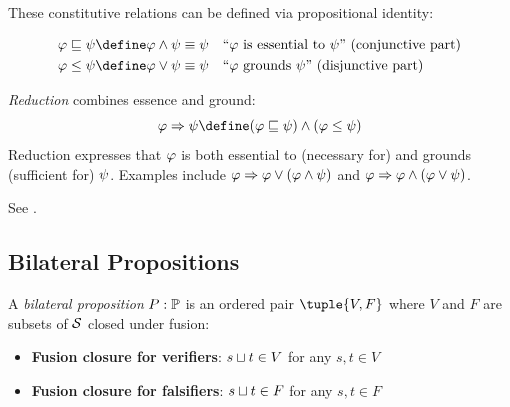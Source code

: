 \documentclass[../LogosReference.tex]{subfiles}
\begin{document}
These constitutive relations can be defined via propositional identity:

\begin{definition}\label{def:essence-ground}
	\begin{align}
		\metaA \essence \metaB & \define \metaA \land \metaB \equiv \metaB &  & \text{``$\metaA$ is essential to $\metaB$'' (conjunctive part)} \\
		\metaA \ground \metaB  & \define \metaA \lor \metaB \equiv \metaB  &  & \text{``$\metaA$ grounds $\metaB$'' (disjunctive part)}
	\end{align}
\end{definition}

\begin{definition}[Reduction]\label{def:reduction}
  \emph{Reduction} combines essence and ground:
  \[
    \metaA \Rightarrow \metaB \define (\metaA \essence \metaB) \land (\metaA \ground \metaB)
  \]
  Reduction expresses that $\varphi$ is both essential to (necessary for) and grounds (sufficient for) $\psi$.
  Examples include $\varphi \Rightarrow \varphi \lor (\varphi \land \psi)$ and $\varphi \Rightarrow \varphi \land (\varphi \lor \psi)$. 
\end{definition}


\noindent
See .


\subsection{Bilateral Propositions}\label{sec:bilateral-propositions}

\begin{definition}\label{def:bilateral-proposition}
	A \emph{bilateral proposition} $P : \mathbb{P}$ is an ordered pair $\tuple{V, F}$ where $V$ and $F$ are subsets of $\mathcal{S}$ closed under fusion:
	\begin{itemize}
		\item \textbf{Fusion closure for verifiers}: $s\sqcup t \in V$ for any $s, t \in V$
		\item \textbf{Fusion closure for falsifiers}: $s\sqcup t \in F$ for any $s, t \in F$
	\end{itemize}
\end{definition}
\end{document}

